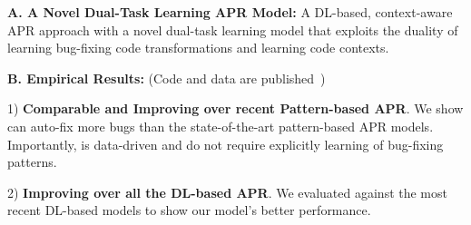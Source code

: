 {\bf A. A Novel Dual-Task Learning APR Model:} A DL-based,
context-aware APR approach with a novel dual-task learning model that
exploits the duality of learning bug-fixing code transformations and
learning code contexts.

{\bf B. Empirical Results:} (Code and data are published~\cite{AutoFix2019})

1) {\bf Comparable and Improving over recent Pattern-based APR}.  We
show {\tool} can auto-fix more bugs than the state-of-the-art
pattern-based APR models. Importantly, {\tool} is data-driven and do
not require explicitly learning of bug-fixing patterns.


2) {\bf Improving over all the DL-based APR}. We evaluated {\tool}
against the most recent DL-based models to show our model's better
performance.




